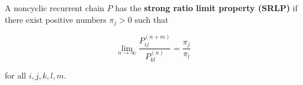 A noncyclic recurrent chain $P$ has the \textbf{strong ratio limit property (SRLP)} if there exist positive numbers $\pi_j > 0$ such that

$$\lim_{n \to \infty} \frac{P_{ij}^{(n+m)}}{P_{kl}^{(n)}} = \frac{\pi_j}{\pi_l}$$

for all $i, j, k, l, m$.

